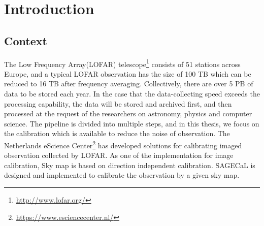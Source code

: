 
\chapter{Introduction}

\ifpdf
    \graphicspath{{1_introduction/figures/PNG/}{1_introduction/figures/PDF/}{1_introduction/figures/}}
\else
    \graphicspath{{1_introduction/figures/EPS/}{1_introduction/figures/}}
\fi







\section{Context} \label{section:intro.contex}
The Low Frequency Array(LOFAR) telescope\footnote{\url{http://www.lofar.org/}} consists of 51 stations across Europe, and a typical LOFAR observation has the size of 100 TB which can be reduced to 16 TB after frequency averaging\cite{Spreeuw2019}.
Collectively, there are over 5 PB of data to be stored each year\cite{Start2020}. 
In the case that the data-collecting speed exceeds the processing capability, the data will be stored and archived first, and then processed at the request of the researchers on astronomy, physics and computer science. 
The pipeline is divided into multiple steps, and in this thesis, we focus on the calibration which is available to reduce the noise of observation. 
The Netherlands eScience Center\footnote{\url{https://www.esciencecenter.nl/}} has developed solutions for calibrating imaged observation collected by LOFAR. As one of the implementation for image calibration, Sky map is based on direction independent calibration. 
SAGECaL is designed and implemented to calibrate the observation by a given sky map\cite{Kazemi2011}.

